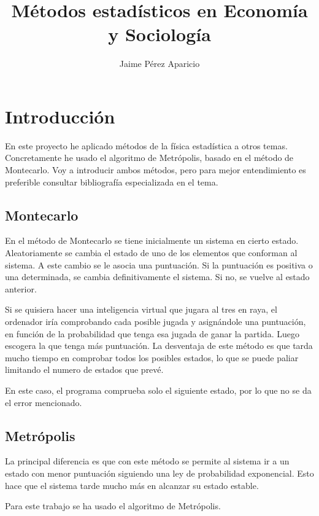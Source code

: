 \documentclass[a4paper,10pt,twocolumn]{article}
\author{Jaime P\'erez Aparicio}
\title{M\'etodos estad\'isticos en Econom\'ia y Sociolog\'ia}
\begin{document}
\maketitle

\section*{Introducci\'on}

En este proyecto he aplicado m\'etodos de la f\'isica estad\'istica a otros temas. Concretamente he usado el algoritmo de Metr\'opolis, basado en el m\'etodo de Montecarlo. Voy a introducir ambos m\'etodos, pero para mejor entendimiento es preferible consultar bibliograf\'ia especializada en el tema.

\subsection*{Montecarlo}

En el m\'etodo de Montecarlo se tiene inicialmente un sistema en cierto estado. Aleatoriamente se cambia el estado de uno de los elementos que conforman al sistema. A este cambio se le asocia una puntuaci\'on. Si la puntuaci\'on es positiva o una determinada, se cambia definitivamente el sistema. Si no, se vuelve al estado anterior. 

Si se quisiera hacer una inteligencia virtual que jugara al tres en raya, el ordenador ir\'ia comprobando cada posible jugada y asign\'andole una puntuaci\'on, en funci\'on de la probabilidad que tenga esa jugada de ganar la partida. Luego escogera la que tenga m\'as puntuaci\'on. La desventaja de este m\'etodo es que tarda mucho tiempo en comprobar todos los posibles estados, lo que se puede paliar limitando el numero de estados que prev\'e. 

En este caso, el programa comprueba solo el siguiente estado, por lo que no se da el error mencionado.

\subsection*{Metr\'opolis}

La principal diferencia es que con este m\'etodo se permite al sistema ir a un estado con menor puntuaci\'on siguiendo una ley de probabilidad exponencial. Esto hace que el sistema tarde mucho m\'as en alcanzar su estado estable.

Para este trabajo se ha usado el algoritmo de Metr\'opolis.
\end{document}
